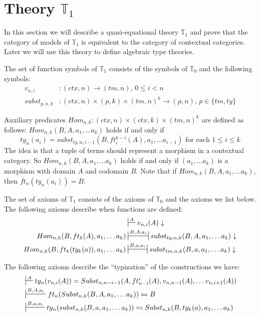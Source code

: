 \documentclass[reqno]{amsart}
\theoremstyle{definition}
\theoremstyle{remark}
\numberwithin{figure}{section}
\begin{document}
\label{sec:T1}
\section{Theory $\mathbb{T}_1$}


In this section we will describe a quasi-equational theory $\mathbb{T}_1$ and prove that the category of models of $\mathbb{T}_1$ is equivalent to the category of contextual categories.
Later we will use this theory to define algebraic type theories.

The set of function symbols of $\mathbb{T}_1$ consists of the symbols of $\mathbb{T}_0$ and the following symbols:
\begin{align*}
v_{n,i}       & : (ctx,n) \to (tm,n) \text{, } 0 \leq i < n \\
subst_{p,n,k} & : (ctx,n) \times (p,k) \times (tm,n)^k \to (p,n) \text{, } p \in \{ tm, ty \}
\end{align*}

Auxiliary predicates $Hom_{n,k} : (ctx,n) \times (ctx,k) \times (tm,n)^k$ are defined as follows: $Hom_{n,k}(B, A, a_1, \ldots a_k)$ holds if and only if
\[ ty_n(a_i) = subst_{ty,n,i-1}(B, ft^{k-i}_i(A), a_1, \ldots a_{i-1}) \text{ for each } 1 \leq i \leq k \]
The idea is that a tuple of terms should represent a morphism in a contextual category.
So $Hom_{n,k}(B, A, a_1, \ldots a_k)$ holds if and only if $(a_1, \ldots a_k)$ is a morphism with domain $A$ and codomain $B$.
Note that if $Hom_{n,k}(B, A, a_1, \ldots a_k)$, then $ft_n(ty_n(a_i)) = B$.

The set of axioms of $\mathbb{T}_1$ consists of the axioms of $\mathbb{T}_0$ and the axioms we list below.
The following axioms describe when functions are defined:
\begin{align}
\label{ax:def-var}
                                             & \sststile{}{A}           v_{n,i}(A) \downarrow \\
\label{ax:def-Subst}
Hom_{n,k}(B, ft_k(A), a_1, \ldots a_k)       & \ssststile{}{B, A, a_i}  subst_{ty,n,k}(B, A, a_1, \ldots a_k) \downarrow \\
\label{ax:def-subst}
Hom_{n,k}(B, ft_k(ty_k(a)), a_1, \ldots a_k) & \ssststile{}{B, a, a_i}  subst_{tm,n,k}(B, a, a_1, \ldots a_k) \downarrow
\end{align}

The following axioms describe the ``typization'' of the constructions we have:
\begin{align}
\label{ax:type-var}
& \sststile{}{A}         ty_n(v_{n,i}(A)) = Subst_{n,n-i-1}(A, ft^i_{n-i}(A), v_{n,n-1}(A), \ldots v_{n,i+1}(A)) \\
\label{ax:type-Subst}
& \sststile{}{B, A, a_i} ft_n(Subst_{n,k}(B, A, a_1, \ldots a_k)) \leftrightharpoons B \\
\label{ax:type-subst}
& \sststile{}{B, a, a_i} ty_n(subst_{n,k}(B, a, a_1, \ldots a_k)) \leftrightharpoons Subst_{n,k}(B, ty_k(a), a_1, \ldots a_k)
\end{align}
\end{document}
